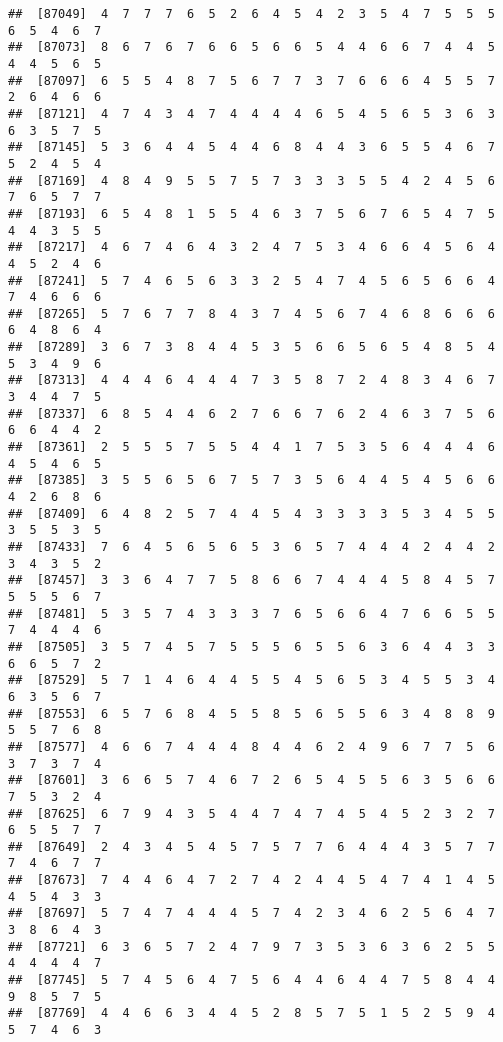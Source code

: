 \documentclass[
]{book}
\begin{document}
\begin{verbatim}
##  [87049]  4  7  7  7  6  5  2  6  4  5  4  2  3  5  4  7  5  5  5  6  5  4  6  7
##  [87073]  8  6  7  6  7  6  6  5  6  6  5  4  4  6  6  7  4  4  5  4  4  5  6  5
##  [87097]  6  5  5  4  8  7  5  6  7  7  3  7  6  6  6  4  5  5  7  2  6  4  6  6
##  [87121]  4  7  4  3  4  7  4  4  4  4  6  5  4  5  6  5  3  6  3  6  3  5  7  5
##  [87145]  5  3  6  4  4  5  4  4  6  8  4  4  3  6  5  5  4  6  7  5  2  4  5  4
##  [87169]  4  8  4  9  5  5  7  5  7  3  3  3  5  5  4  2  4  5  6  7  6  5  7  7
##  [87193]  6  5  4  8  1  5  5  4  6  3  7  5  6  7  6  5  4  7  5  4  4  3  5  5
##  [87217]  4  6  7  4  6  4  3  2  4  7  5  3  4  6  6  4  5  6  4  4  5  2  4  6
##  [87241]  5  7  4  6  5  6  3  3  2  5  4  7  4  5  6  5  6  6  4  7  4  6  6  6
##  [87265]  5  7  6  7  7  8  4  3  7  4  5  6  7  4  6  8  6  6  6  6  4  8  6  4
##  [87289]  3  6  7  3  8  4  4  5  3  5  6  6  5  6  5  4  8  5  4  5  3  4  9  6
##  [87313]  4  4  4  6  4  4  4  7  3  5  8  7  2  4  8  3  4  6  7  3  4  4  7  5
##  [87337]  6  8  5  4  4  6  2  7  6  6  7  6  2  4  6  3  7  5  6  6  6  4  4  2
##  [87361]  2  5  5  5  7  5  5  4  4  1  7  5  3  5  6  4  4  4  6  4  5  4  6  5
##  [87385]  3  5  5  6  5  6  7  5  7  3  5  6  4  4  5  4  5  6  6  4  2  6  8  6
##  [87409]  6  4  8  2  5  7  4  4  5  4  3  3  3  3  5  3  4  5  5  3  5  5  3  5
##  [87433]  7  6  4  5  6  5  6  5  3  6  5  7  4  4  4  2  4  4  2  3  4  3  5  2
##  [87457]  3  3  6  4  7  7  5  8  6  6  7  4  4  4  5  8  4  5  7  5  5  5  6  7
##  [87481]  5  3  5  7  4  3  3  3  7  6  5  6  6  4  7  6  6  5  5  7  4  4  4  6
##  [87505]  3  5  7  4  5  7  5  5  5  6  5  5  6  3  6  4  4  3  3  6  6  5  7  2
##  [87529]  5  7  1  4  6  4  4  5  5  4  5  6  5  3  4  5  5  3  4  6  3  5  6  7
##  [87553]  6  5  7  6  8  4  5  5  8  5  6  5  5  6  3  4  8  8  9  5  5  7  6  8
##  [87577]  4  6  6  7  4  4  4  8  4  4  6  2  4  9  6  7  7  5  6  3  7  3  7  4
##  [87601]  3  6  6  5  7  4  6  7  2  6  5  4  5  5  6  3  5  6  6  7  5  3  2  4
##  [87625]  6  7  9  4  3  5  4  4  7  4  7  4  5  4  5  2  3  2  7  6  5  5  7  7
##  [87649]  2  4  3  4  5  4  5  7  5  7  7  6  4  4  4  3  5  7  7  7  4  6  7  7
##  [87673]  7  4  4  6  4  7  2  7  4  2  4  4  5  4  7  4  1  4  5  4  5  4  3  3
##  [87697]  5  7  4  7  4  4  4  5  7  4  2  3  4  6  2  5  6  4  7  3  8  6  4  3
##  [87721]  6  3  6  5  7  2  4  7  9  7  3  5  3  6  3  6  2  5  5  4  4  4  4  7
##  [87745]  5  7  4  5  6  4  7  5  6  4  4  6  4  4  7  5  8  4  4  9  8  5  7  5
##  [87769]  4  4  6  6  3  4  4  5  2  8  5  7  5  1  5  2  5  9  4  5  7  4  6  3

\end{verbatim}
\end{document}
